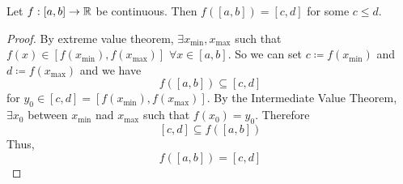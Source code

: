 \documentclass[openany]{report}
\begin{document}
    \begin{corollary}
        Let $f: [a,b] \rightarrow \mathbb{R}$ be continuous. Then $f([a,b]) = [c,d]$ for some $c \leq d$. 
    \end{corollary}
    \begin{proof}
        By extreme value theorem, $\exists x_{\min}, x_{\max}$ such that $f(x) \in [f(x_{\min}), f(x_{\max})]$ $\forall x \in [a,b]$. So we can set $c \coloneqq f(x_{\min})$ and $d \coloneqq f(x_{\max})$ and we have
        \[f([a,b]) \subseteq [c,d]\]
        for $y_0 \in [c,d] = [f(x_{\min}), f(x_{\max})]$. By the Intermediate Value Theorem, $\exists x_0$ between $x_{\min}$ nad $x_{\max}$ such that $f(x_0) = y_0$. Therefore
        \[[c,d] \subseteq f([a,b])\]
        Thus, 
        \[f([a,b]) = [c,d]\]
        \end{proof}
\end{document}
